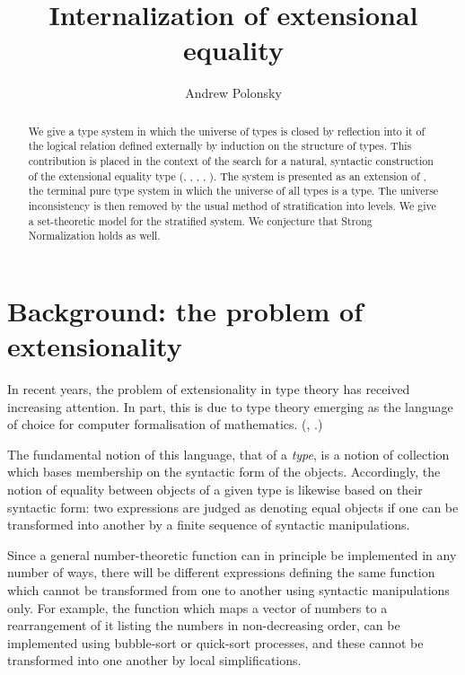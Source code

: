 \documentclass[10pt]{article}
\title{Internalization of extensional equality}
\author{Andrew Polonsky}
\begin{document}
\maketitle

\begin{abstract}
We give a type system in which the universe of types is closed by
reflection into it of the logical relation defined
externally by induction on the
structure of types.
This contribution is placed in the context of the search for a
natural, syntactic construction of the extensional equality type
(\cite{tait}, \cite{thorsten1999}, \cite{coquand}, \cite{harper}, \cite{perML}).
The system is presented as an extension of , the terminal pure
type system in which the universe of all types is a type.
The universe inconsistency is then removed by the usual method of
stratification into levels.
We give a set-theoretic model for the stratified
system.  We conjecture that Strong Normalization holds as well.
\end{abstract}

\section{Background: the problem of extensionality}

In recent years, the problem of extensionality in type theory has
received increasing attention.  In part, this is due to
type theory emerging as the language of choice for
computer formalisation of mathematics.
(\cite{Gonthier},  \cite{thehomotopybook}.)

The fundamental notion of this language, that of a \emph{type},
is a notion of collection which bases membership on the
syntactic form of the objects.  Accordingly, the notion of
equality between objects of a given type is likewise based
on their syntactic form:
two expressions are judged as denoting equal objects
if one can be transformed into another by a finite
sequence of syntactic manipulations.

Since a general number-theoretic function can in principle be
implemented in any number of ways, there will be
different expressions defining the same function which cannot
be transformed from one to another using syntactic manipulations only.
For example, the function which maps a vector of numbers
to a rearrangement of it listing the numbers in non-decreasing order,
can be implemented using bubble-sort or quick-sort processes,
and these cannot be transformed into one another by local
simplifications.
\end{document}
